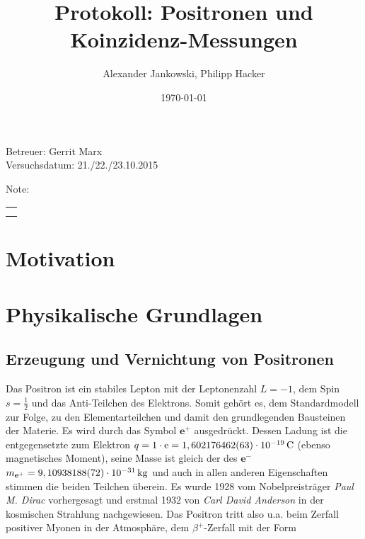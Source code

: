 \documentclass[numbers=noenddot,a4paper,notitlepage,twoside,BCOR15mm]{scrartcl}
\title{Protokoll: Positronen und Koinzidenz-Messungen} %
\author{Alexander Jankowski, Philipp Hacker}
\date{\today}
\newcommand{\tenpo}[1]{ 10^{#1}}
\newcommand{\tilt}[1]{\textit{#1}}
\begin{document}
	\maketitle
	\begin{center}
		Betreuer: Gerrit Marx\\ %
		Versuchsdatum: 21./22./23.10.2015\\ %
		\begin{table}[h]
			\centering
			Note: %
			\begin{tabularx}{1.5cm}{|X|}
				\hline \\ \\
				\hline
			\end{tabularx}
		\end{table}
	\end{center}
	\vspace*{\fill}
	\tableofcontents
	\vfill
	\newpage
	\section{Motivation}
	
	\newpage
	\section{Physikalische Grundlagen}
	\subsection{Erzeugung und Vernichtung von Positronen}

		Das Positron ist ein stabiles Lepton mit der Leptonenzahl $L=-1$, dem Spin $s=\frac{1}{2}$ und das Anti-Teilchen des Elektrons. Somit gehört es, dem Standardmodell zur Folge, zu den Elementarteilchen und damit den grundlegenden Bausteinen der Materie. Es wird durch das Symbol $\textbf{e}^+$ ausgedrückt. Dessen Ladung ist die entgegensetzte zum Elektron $q=1\cdot\text{e}=\unit[1,602 176462(63)\cdot\tenpo{-19}]{C}$ (ebenso magnetisches Moment), seine Masse ist gleich der des $\textbf{e}^-$ $m_{\textbf{e}^+}=\unit[9,10938188(72)\cdot\tenpo{-31}]{kg}$ und auch in allen anderen Eigenschaften stimmen die beiden Teilchen überein. Es wurde 1928 vom Nobelpreisträger \tilt{Paul M. Dirac} vorhergesagt und erstmal 1932 von \tilt{Carl David Anderson} in der kosmischen Strahlung nachgewiesen. Das Positron tritt also u.a. beim Zerfall positiver Myonen in der Atmosphäre, dem $\beta^+$-Zerfall mit der Form
		
\end{document}
